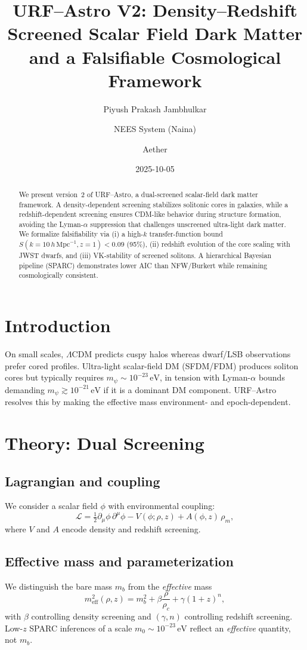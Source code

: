 \documentclass[12pt]{article}
\title{\textbf{URF--Astro V2: Density--Redshift Screened Scalar Field Dark Matter and a Falsifiable Cosmological Framework}}
\author{Piyush Prakash Jambhulkar \and NEES System (Naina) \and Aether}
\date{2025-10-05}
\begin{document}
\maketitle

\begin{abstract}
We present version~2 of URF--Astro, a dual-screened scalar-field dark matter framework.
A density-dependent screening stabilizes solitonic cores in galaxies, while a redshift-dependent screening ensures CDM-like behavior during structure formation, avoiding the Lyman-$\alpha$ suppression that challenges unscreened ultra-light dark matter. We formalize falsifiability via (i) a high-$k$ transfer-function bound $S(k\!=\!10\,h\,\mathrm{Mpc}^{-1},z\!=\!1)<0.09$ (95\%), (ii) redshift evolution of the core scaling with JWST dwarfs, and (iii) VK-stability of screened solitons. A hierarchical Bayesian pipeline (SPARC) demonstrates lower AIC than NFW/Burkert while remaining cosmologically consistent.
\end{abstract}

\section{Introduction}
\label{sec:intro}
On small scales, $\Lambda$CDM predicts cuspy halos whereas dwarf/LSB observations prefer cored profiles.
Ultra-light scalar-field DM (SFDM/FDM) produces soliton cores but typically requires $m_\psi\sim 10^{-23}\,\mathrm{eV}$, in tension with Lyman-$\alpha$ bounds demanding $m_\psi\gtrsim 10^{-21}\,\mathrm{eV}$ if it is a dominant DM component.
URF--Astro resolves this by making the effective mass environment- and epoch-dependent.

\section{Theory: Dual Screening}
\subsection{Lagrangian and coupling}
We consider a scalar field $\phi$ with environmental coupling:
\begin{equation}
\mathcal{L}=\tfrac{1}{2}\partial_\mu\phi\,\partial^\mu\phi - V(\phi;\rho,z) + A(\phi,z)\,\rho_m,
\end{equation}
where $V$ and $A$ encode density and redshift screening.

\subsection{Effective mass and parameterization}
We distinguish the bare mass $m_b$ from the \emph{effective} mass
\begin{equation}
m^2_{\mathrm{eff}}(\rho,z)=m_b^2 + \beta \frac{\rho}{\rho_c} + \gamma (1+z)^{n},
\label{eq:meff}
\end{equation}
with $\beta$ controlling density screening and $(\gamma,n)$ controlling redshift screening.
Low-$z$ SPARC inferences of a scale $m_0\sim 10^{-23}\,\mathrm{eV}$ reflect an \emph{effective} quantity, not $m_b$.
\end{document}
